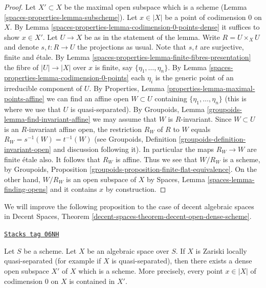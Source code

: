 \begin{proof}
Let $X' \subset X$ be the maximal open subspace which is a scheme
(Lemma \ref{spaces-properties-lemma-subscheme}).
Let $x \in |X|$ be a point of codimension $0$ on $X$.
By Lemma \ref{spaces-properties-lemma-codimension-0-points-dense}
it suffices to show $x \in X'$.
Let $U \to X$ be as in the statement of the lemma.
Write $R = U \times_X U$ and denote $s, t : R \to U$ the projections as usual.
Note that $s, t$ are surjective, finite and \'etale.
By Lemma \ref{spaces-properties-lemma-finite-fibres-presentation}
the fibre of $|U| \to |X|$ over $x$ is finite, say
$\{\eta_1, \ldots, \eta_n\}$. By Lemma \ref{spaces-properties-lemma-codimension-0-points}
each $\eta_i$ is the generic point of an irreducible component of $U$.
By Properties, Lemma \ref{properties-lemma-maximal-points-affine}
we can find an affine open $W \subset U$ containing
$\{\eta_1, \ldots, \eta_n\}$
(this is where we use that $U$ is quasi-separated). By
Groupoids, Lemma \ref{groupoids-lemma-find-invariant-affine}
we may assume that $W$ is $R$-invariant.
Since $W \subset U$ is an $R$-invariant affine open, the restriction
$R_W$ of $R$ to $W$ equals $R_W = s^{-1}(W) = t^{-1}(W)$ (see
Groupoids, Definition \ref{groupoids-definition-invariant-open}
and discussion following it). In particular the maps $R_W \to W$ are
finite \'etale also. It follows that $R_W$ is affine.
Thus we see that $W/R_W$ is a scheme, by
Groupoids, Proposition \ref{groupoids-proposition-finite-flat-equivalence}.
On the other hand, $W/R_W$ is an open subspace of $X$ by
Spaces, Lemma \ref{spaces-lemma-finding-opens} and it contains
$x$ by construction.
\end{proof}

We will improve the following proposition to the case of
decent algebraic spaces in
Decent Spaces, Theorem
\ref{decent-spaces-theorem-decent-open-dense-scheme}.

\begin{proposition}
\label{spaces-properties-proposition-locally-quasi-separated-open-dense-scheme}
\href{https://stacks.math.columbia.edu/tag/06NH}{\texttt{Stacks tag 06NH}}

Let $S$ be a scheme. Let $X$ be an algebraic space over $S$. If $X$ is
Zariski locally quasi-separated (for example if $X$ is quasi-separated), then
there exists a dense open subspace $X'$ of $X$ which is a scheme.
More precisely, every point $x \in |X|$ of codimension $0$ on $X$
is contained in $X'$.
\end{proposition}

